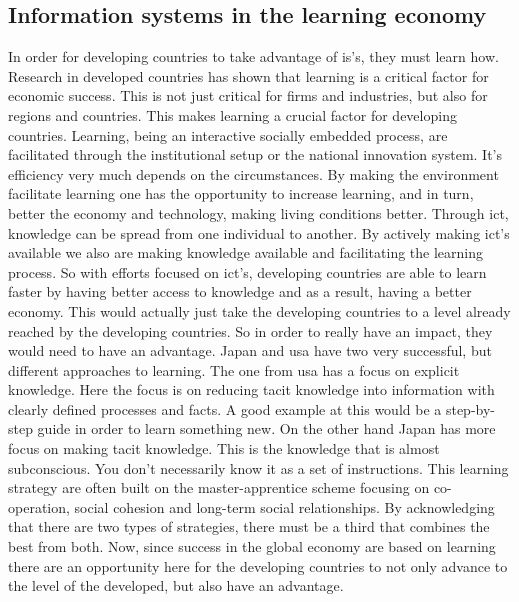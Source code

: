 \subsection{Information systems in the learning economy}
\label{infolearnec}
In order for developing countries to take advantage of \gls{is}'s, they must learn how.
Research in developed countries has shown that learning is a critical factor for economic success.
This is not just critical for firms and industries, but also for regions and countries.
This makes learning a crucial factor for developing countries. 
Learning, being an interactive socially embedded process, are facilitated through the institutional setup or the national innovation system. It's efficiency very much depends on the circumstances.
By making the environment facilitate learning one has the opportunity to increase learning, and in turn, better the economy and technology, making living conditions better. 
Through \gls{ict}, knowledge can be spread from one individual to another. 
By actively making \gls{ict}'s available we also are making knowledge available and facilitating the learning process. 
So with efforts focused on \gls{ict}'s, developing countries are able to learn faster by having better access to knowledge and as a result, having a better economy.
This would actually just take the developing countries to a level already reached by the developing countries. 
So in order to really have an impact, they would need to have an advantage. 
Japan and \gls{usa} have two very successful, but different approaches to learning. 
The one from \gls{usa} has a focus on explicit knowledge. 
Here the focus is on reducing tacit knowledge into information with clearly defined processes and facts. 
A good example at this would be a step-by-step guide in order to learn something new. 
On the other hand Japan has more focus on making tacit knowledge. 
This is the knowledge that is almost subconscious. 
You don't necessarily know it as a set of instructions. 
This learning strategy are often built on the master-apprentice scheme focusing on co-operation, social cohesion and long-term social relationships. 
By acknowledging that there are two types of strategies, there must be a third that combines the best from both. 
Now, since success in the global economy are based on learning there are an opportunity here for the developing countries to not only advance to the level of the developed, but also have an advantage. 

\cite{gedi:erik}





